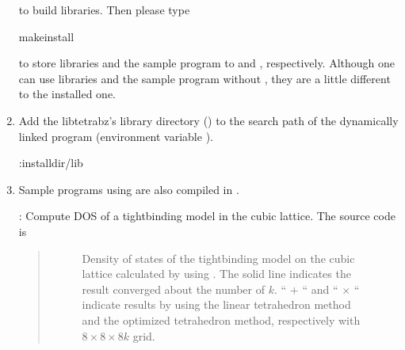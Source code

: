 \documentclass[letterpaper,10pt,pdftex,openany,english]{sphinxmanual}
\begin{document}
\begin{enumerate}
\sphinxAtStartPar
to build libraries. Then please type

\begin{sphinxVerbatim}[commandchars=\\\{\}]
\PYGZdl{}makeinstall
\end{sphinxVerbatim}

\sphinxAtStartPar
to store libraries and the sample program to  and , respectively.
Although one can use libraries and the sample program without ,
they are a little different to the installed one.

\item {} 
\sphinxAtStartPar
Add the libtetrabz’s library directory () to the
search path of the dynamically linked program (environment variable ).

\begin{sphinxVerbatim}[commandchars=\\\{\}]
\PYGZdl{}:install\PYGZus{}dir/lib
\end{sphinxVerbatim}

\item {} 
\sphinxAtStartPar
Sample programs using  are also compiled in  .

\sphinxAtStartPar
{} : Compute DOS of a tight\sphinxhyphen{}binding model in the cubic
lattice. The source code is 
\begin{quote}

\begin{figure}[htbp]
\centering
\capstart

\noindent{}
\caption{Density of states of the tight\sphinxhyphen{}binding model on the
cubic lattice calculated by using .
The solid line indicates the
result converged about the number of \(k\).
“ \(+\) “ and “ \(\times\) “ indicate
results by using the linear tetrahedron method and the optimized
tetrahedron method,
respectively with \(8\times8\times8 k\) grid.}\label{\detokenize{install:id1}}\end{figure}
\end{quote}


\end{enumerate}
\end{document}

